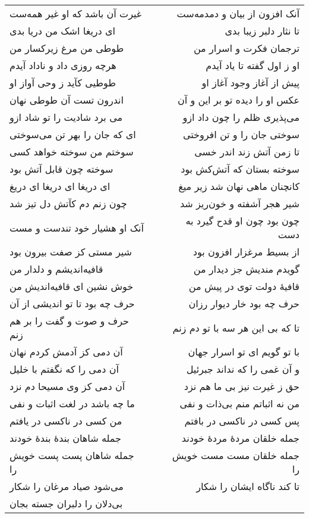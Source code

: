 \begin{center}
\begin{longtable}{l p{0.5cm} r}
غیرت آن باشد که او غیر همه‌ست
&&
آنک افزون از بیان و دمدمه‌ست
\\
ای دریغا اشک من دریا بدی
&&
تا نثار دلبر زیبا بدی
\\
طوطی من مرغ زیرکسار من
&&
ترجمان فکرت و اسرار من
\\
هرچه روزی داد و ناداد آیدم
&&
او ز اول گفته تا یاد آیدم
\\
طوطیی کآید ز وحی آواز او
&&
پیش از آغاز وجود آغاز او
\\
اندرون تست آن طوطی نهان
&&
عکس او را دیده تو بر این و آن
\\
می برد شادیت را تو شاد ازو
&&
می‌پذیری ظلم را چون داد ازو
\\
ای که جان را بهر تن می‌سوختی
&&
سوختی جان را و تن افروختی
\\
سوختم من سوخته خواهد کسی
&&
تا زمن آتش زند اندر خسی
\\
سوخته چون قابل آتش بود
&&
سوخته بستان که آتش‌کش بود
\\
ای دریغا ای دریغا ای دریغ
&&
کانچنان ماهی نهان شد زیر میغ
\\
چون زنم دم کآتش دل تیز شد
&&
شیر هجر آشفته و خون‌ریز شد
\\
آنک او هشیار خود تندست و مست
&&
چون بود چون او قدح گیرد به دست
\\
شیر مستی کز صفت بیرون بود
&&
از بسیط مرغزار افزون بود
\\
قافیه‌اندیشم و دلدار من
&&
گویدم مندیش جز دیدار من
\\
خوش نشین ای قافیه‌اندیش من
&&
قافیهٔ دولت توی در پیش من
\\
حرف چه بود تا تو اندیشی از آن
&&
حرف چه بود خار دیوار رزان
\\
حرف و صوت و گفت را بر هم زنم
&&
تا که بی این هر سه با تو دم زنم
\\
آن دمی کز آدمش کردم نهان
&&
با تو گویم ای تو اسرار جهان
\\
آن دمی را که نگفتم با خلیل
&&
و آن غمی را که نداند جبرئیل
\\
آن دمی کز وی مسیحا دم نزد
&&
حق ز غیرت نیز بی ما هم نزد
\\
ما چه باشد در لغت اثبات و نفی
&&
من نه اثباتم منم بی‌ذات و نفی
\\
من کسی در ناکسی در یافتم
&&
پس کسی در ناکسی در بافتم
\\
جمله شاهان بندهٔ بندهٔ خودند
&&
جمله خلقان مردهٔ مردهٔ خودند
\\
جمله شاهان پست پست خویش را
&&
جمله خلقان مست مست خویش را
\\
می‌شود صیاد مرغان را شکار
&&
تا کند ناگاه ایشان را شکار
\\
بی‌دلان را دلبران جسته بجان

\end{longtable}
\end{center}
